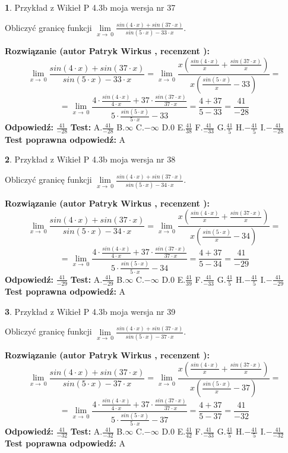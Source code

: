 \documentclass[12pt, a4paper]{article}
\theoremstyle{definition} %
\newtheorem{zad}{}
\newcommand{\zadStart}[1]{\begin{zad}#1\newline}
\newcommand{\zadStop}{\end{zad}}
\newcommand{\rozwStart}[2]{\noindent \textbf{Rozwiązanie (autor #1 , recenzent #2): }\newline}
\newcommand{\rozwStop}{\newline}
\newcommand{\odpStart}{\noindent \textbf{Odpowiedź:}\newline}
\newcommand{\odpStop}{\newline}
\newcommand{\testStart}{\noindent \textbf{Test:}\newline}
\newcommand{\testStop}{\newline}
\newcommand{\kluczStart}{\noindent \textbf{Test poprawna odpowiedź:}\newline}
\newcommand{\kluczStop}{\newline}
\begin{document}
\zadStart{Przykład z Wikieł P 4.3b moja wersja nr 37}


Obliczyć granicę funkcji $\lim\limits_{x\to\ 0}\frac{sin(4 \cdot x)+sin(37 \cdot x)}{sin(5 \cdot x)-33 \cdot x}$.
\zadStop
\rozwStart{Patryk Wirkus}{}
$$\lim\limits_{x\to\ 0}\frac{sin(4 \cdot x)+sin(37 \cdot x)}{sin(5 \cdot x)-33 \cdot x}=\lim\limits_{x\to\ 0}\frac{x(\frac{sin(4 \cdot x)}{x}+\frac{sin(37 \cdot x)}{x})}{x(\frac{sin(5 \cdot x)}{x}-33)}=$$
$$=\lim\limits_{x\to\ 0}\frac{4 \cdot \frac{sin(4 \cdot x)}{4 \cdot x}+37 \cdot \frac{sin(37 \cdot x)}{37 \cdot x}}{5 \cdot \frac{sin(5 \cdot x)}{5 \cdot x}-33}=\frac{4+37}{5-33} = \frac{41}{-28}$$
\rozwStop
\odpStart
$\frac{41}{-28}$
\odpStop
\testStart
A.$\frac{41}{-28}$
B.$\infty$
C.$-\infty$
D.$0$
E.$\frac{41}{38}$
F.$\frac{41}{-33}$
G.$\frac{41}{5}$
H.$-\frac{41}{5}$
I.$-\frac{41}{-28}$
\testStop
\kluczStart
A
\kluczStop



\zadStart{Przykład z Wikieł P 4.3b moja wersja nr 38}


Obliczyć granicę funkcji $\lim\limits_{x\to\ 0}\frac{sin(4 \cdot x)+sin(37 \cdot x)}{sin(5 \cdot x)-34 \cdot x}$.
\zadStop
\rozwStart{Patryk Wirkus}{}
$$\lim\limits_{x\to\ 0}\frac{sin(4 \cdot x)+sin(37 \cdot x)}{sin(5 \cdot x)-34 \cdot x}=\lim\limits_{x\to\ 0}\frac{x(\frac{sin(4 \cdot x)}{x}+\frac{sin(37 \cdot x)}{x})}{x(\frac{sin(5 \cdot x)}{x}-34)}=$$
$$=\lim\limits_{x\to\ 0}\frac{4 \cdot \frac{sin(4 \cdot x)}{4 \cdot x}+37 \cdot \frac{sin(37 \cdot x)}{37 \cdot x}}{5 \cdot \frac{sin(5 \cdot x)}{5 \cdot x}-34}=\frac{4+37}{5-34} = \frac{41}{-29}$$
\rozwStop
\odpStart
$\frac{41}{-29}$
\odpStop
\testStart
A.$\frac{41}{-29}$
B.$\infty$
C.$-\infty$
D.$0$
E.$\frac{41}{39}$
F.$\frac{41}{-33}$
G.$\frac{41}{5}$
H.$-\frac{41}{5}$
I.$-\frac{41}{-29}$
\testStop
\kluczStart
A
\kluczStop



\zadStart{Przykład z Wikieł P 4.3b moja wersja nr 39}


Obliczyć granicę funkcji $\lim\limits_{x\to\ 0}\frac{sin(4 \cdot x)+sin(37 \cdot x)}{sin(5 \cdot x)-37 \cdot x}$.
\zadStop
\rozwStart{Patryk Wirkus}{}
$$\lim\limits_{x\to\ 0}\frac{sin(4 \cdot x)+sin(37 \cdot x)}{sin(5 \cdot x)-37 \cdot x}=\lim\limits_{x\to\ 0}\frac{x(\frac{sin(4 \cdot x)}{x}+\frac{sin(37 \cdot x)}{x})}{x(\frac{sin(5 \cdot x)}{x}-37)}=$$
$$=\lim\limits_{x\to\ 0}\frac{4 \cdot \frac{sin(4 \cdot x)}{4 \cdot x}+37 \cdot \frac{sin(37 \cdot x)}{37 \cdot x}}{5 \cdot \frac{sin(5 \cdot x)}{5 \cdot x}-37}=\frac{4+37}{5-37} = \frac{41}{-32}$$
\rozwStop
\odpStart
$\frac{41}{-32}$
\odpStop
\testStart
A.$\frac{41}{-32}$
B.$\infty$
C.$-\infty$
D.$0$
E.$\frac{41}{42}$
F.$\frac{41}{-33}$
G.$\frac{41}{5}$
H.$-\frac{41}{5}$
I.$-\frac{41}{-32}$
\testStop
\kluczStart
A
\kluczStop
\end{document}
